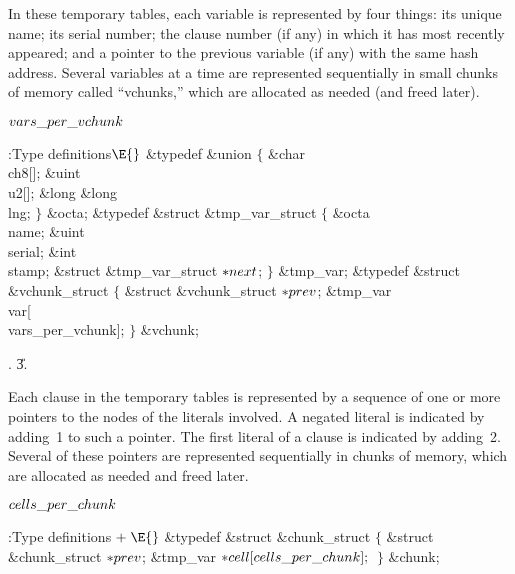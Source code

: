 In these temporary tables, each variable is represented by four things:
its unique name; its serial number; the clause number (if any) in which it has
most recently appeared; and a pointer to the previous variable (if any)
with the same hash address. Several variables at a time
are represented sequentially in small chunks of memory called ``vchunks,''
which are allocated as needed (and freed later).

\Y\B\4\D$\\{vars\_per\_vchunk}$ \5
\par
\Y\B\4:Type definitions\X${}\E{}$\6
\&{typedef} \&{union} ${}\{{}$\1\6
\&{char} \\{ch8}[];\6
\&{uint} \\{u2}[];\6
\&{long} \&{long} \\{lng};\2\6
${}\}{}$ \&{octa};\6
\&{typedef} \&{struct} \&{tmp\_var\_struct} ${}\{{}$\1\6
\&{octa} \\{name};\6
\&{uint} \\{serial};\6
\&{int} \\{stamp};\6
\&{struct} \&{tmp\_var\_struct} ${}{*}\\{next}{}$;\2%
\6
${}\}{}$ \&{tmp\_var};\7
\&{typedef} \&{struct} \&{vchunk\_struct} ${}\{{}$\1\6
\&{struct} \&{vchunk\_struct} ${}{*}\\{prev}{}$;\6
\&{tmp\_var} \\{var}[\\{vars\_per\_vchunk}];\2\6
${}\}{}$ \&{vchunk};\par
{}.
\U3.\fi

Each clause in the temporary tables is represented by a sequence of
one or more pointers to the  nodes of the literals involved.
A negated literal is indicated by adding~1 to such a pointer.
The first literal of a clause is indicated by adding~2.
Several of these pointers are represented sequentially in chunks
of memory, which are allocated as needed and freed later.

\Y\B\4\D$\\{cells\_per\_chunk}$ \5
\par
\Y\B\4:Type definitions\X${}\mathrel+\E{}$\6
\&{typedef} \&{struct} \&{chunk\_struct} ${}\{{}$\1\6
\&{struct} \&{chunk\_struct} ${}{*}\\{prev}{}$;\6
\&{tmp\_var} ${}{*}\\{cell}[\\{cells\_per\_chunk}];{}$\2\6
${}\}{}$ \&{chunk};\par
\fi


